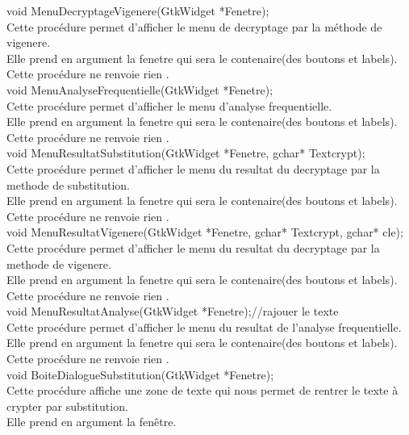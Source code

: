 \documentclass[a4]{article}
\begin{document}
	void MenuDecryptageVigenere(GtkWidget *Fenetre);\\
		Cette procédure permet d'afficher le menu de decryptage par la méthode de vigenere.\\
		Elle prend en argument la fenetre qui sera le contenaire(des boutons et labels).\\
		Cette procédure ne renvoie rien .\\
	
	void MenuAnalyseFrequentielle(GtkWidget *Fenetre);\\
		Cette procédure permet d'afficher le menu d'analyse frequentielle.\\
		Elle prend en argument la fenetre qui sera le contenaire(des boutons et labels).\\
		Cette procédure ne renvoie rien .\\
	
	void MenuResultatSubstitution(GtkWidget *Fenetre, gchar* Textcrypt);\\
		Cette procédure permet d'afficher le menu du resultat du decryptage par la methode de substitution.\\
		Elle prend en argument la fenetre qui sera le contenaire(des boutons et labels).\\
		Cette procédure ne renvoie rien .\\
	
	void MenuResultatVigenere(GtkWidget *Fenetre, gchar* Textcrypt, gchar* cle);\\
		Cette procédure permet d'afficher le menu du resultat du decryptage par la methode de vigenere.\\
		Elle prend en argument la fenetre qui sera le contenaire(des boutons et labels).\\
		Cette procédure ne renvoie rien .\\
	
	void MenuResultatAnalyse(GtkWidget *Fenetre);//rajouer le texte\\
		Cette procédure permet d'afficher le menu du resultat de l'analyse frequentielle.\\
		Elle prend en argument la fenetre qui sera le contenaire(des boutons et labels).\\
		Cette procédure ne renvoie rien .\\
	
	void BoiteDialogueSubstitution(GtkWidget *Fenetre);\\
		Cette procédure affiche une zone de texte qui nous permet de rentrer le texte à crypter par substitution.\\
		Elle prend en argument la fenêtre.\\
	
\end{document}
